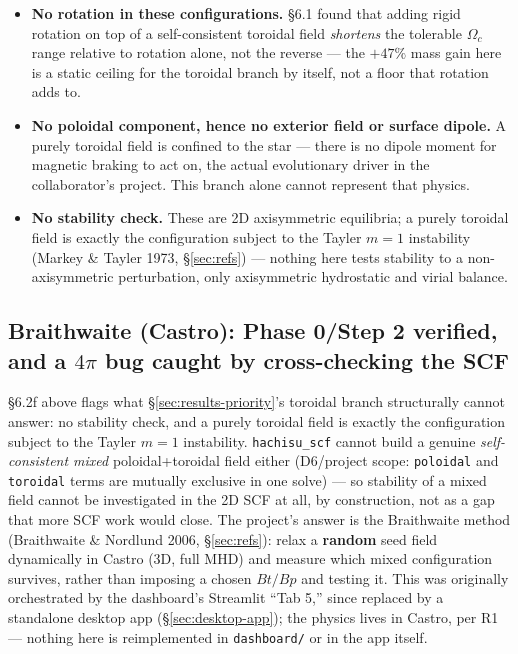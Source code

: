 \documentclass[11pt,a4paper]{scrartcl}
\newcommand{\code}[1]{\texttt{\small #1}}
\begin{document}
\begin{itemize}[leftmargin=1.4em,itemsep=0.2em]
\item \textbf{No rotation in these configurations.} \S6.1 found that
  adding rigid rotation on top of a self-consistent toroidal field
  \emph{shortens} the tolerable $\Omega_c$ range relative to rotation
  alone, not the reverse --- the $+47\%$ mass gain here is a static
  ceiling for the toroidal branch by itself, not a floor that rotation
  adds to.
\item \textbf{No poloidal component, hence no exterior field or
  surface dipole.} A purely toroidal field is confined to the star ---
  there is no dipole moment for magnetic braking to act on, the actual
  evolutionary driver in the collaborator's project. This branch alone
  cannot represent that physics.
\item \textbf{No stability check.} These are 2D axisymmetric
  equilibria; a purely toroidal field is exactly the configuration
  subject to the Tayler $m=1$ instability (Markey \& Tayler 1973,
  \S\ref{sec:refs}) --- nothing here tests stability to a
  non-axisymmetric perturbation, only axisymmetric hydrostatic and
  virial balance.
\end{itemize}

\subsection[Braithwaite (Castro): Phase 0/Step 2, and a 4pi bug]{Braithwaite (Castro): Phase 0/Step 2 verified, and a \texorpdfstring{$4\pi$}{4pi} bug caught by cross-checking the SCF}
\label{sec:braithwaite}

\S6.2f above flags what \S\ref{sec:results-priority}'s toroidal branch
structurally cannot answer: no stability check, and a purely toroidal
field is exactly the configuration subject to the Tayler $m=1$
instability. \code{hachisu\_scf} cannot build a genuine
\emph{self-consistent mixed} poloidal+toroidal field either (D6/project
scope: \code{poloidal} and \code{toroidal} terms are mutually exclusive
in one solve) --- so stability of a mixed field cannot be investigated
in the 2D SCF at all, by construction, not as a gap that more SCF work
would close. The project's answer is the Braithwaite method (Braithwaite
\& Nordlund 2006, \S\ref{sec:refs}): relax a \textbf{random} seed field
dynamically in Castro (3D, full MHD) and measure which mixed
configuration survives, rather than imposing a chosen $Bt/Bp$ and
testing it. This was originally orchestrated by the dashboard's
Streamlit ``Tab 5,'' since replaced by a standalone desktop app
(\S\ref{sec:desktop-app}); the physics lives in Castro, per R1 ---
nothing here is reimplemented in \code{dashboard/} or in the app
itself.
\end{document}
